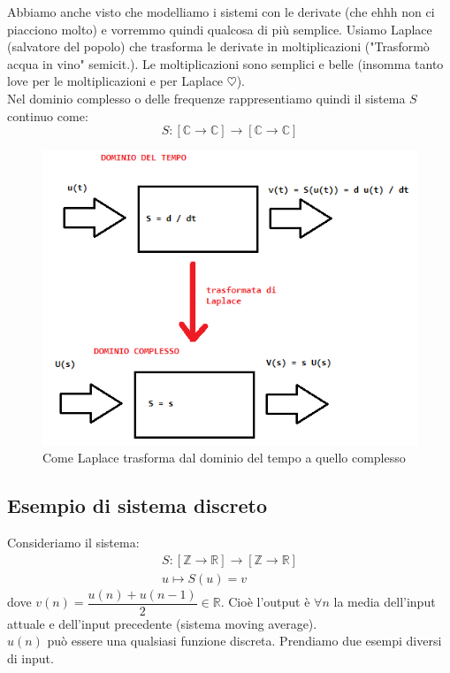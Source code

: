 Abbiamo anche visto che modelliamo i sistemi con le derivate (che ehhh non ci piacciono molto) e vorremmo quindi qualcosa di più semplice. Usiamo Laplace (salvatore del popolo) che trasforma le derivate in moltiplicazioni ("Trasformò acqua in vino" semicit.). Le moltiplicazioni sono semplici e belle (insomma tanto love per le moltiplicazioni e per Laplace $\heartsuit$).\\

Nel dominio complesso o delle frequenze rappresentiamo quindi il sistema $S$ continuo come: \\
\begin{equation*}
S: [\mathbb{C} \rightarrow \mathbb{C}] \rightarrow [\mathbb{C} \rightarrow \mathbb{C}]
\end{equation*}

\begin{figure}[h]
	\centering
	\includegraphics[width=0.7\linewidth]{immagini/LaplaceLove}
	\caption{ Come Laplace trasforma dal dominio del tempo a quello complesso }
	\label{fig: Sistema Laplace}
\end{figure}

\subsection*{Esempio di sistema discreto}
Consideriamo il sistema: \\
\begin{equation*}
	\begin{split}
	S: [\mathbb{Z} \rightarrow \mathbb{R}] \rightarrow [\mathbb{Z} \rightarrow \mathbb{R}] \\
	u \mapsto S(u) = v
	\end{split}
\end{equation*}
dove $v(n) = \dfrac{u(n)+u(n-1)}{2} \in \mathbb{R} $. Cioè l'output è $\forall n $ la media dell'input attuale e dell'input precedente (sistema moving average).\\
$u(n)$ può essere una qualsiasi funzione discreta. Prendiamo due esempi diversi di input.\\


